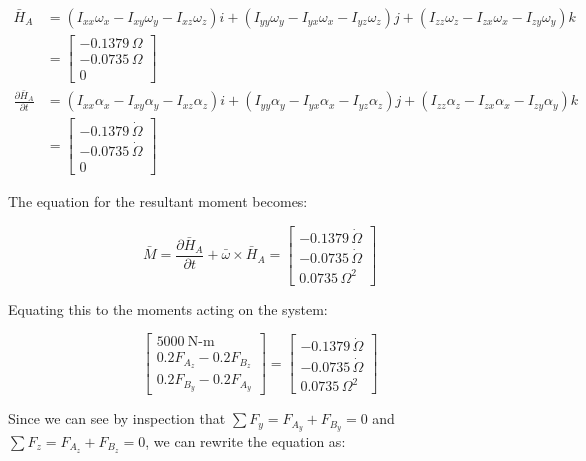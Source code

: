 \documentclass[12pt, letterpaper]{../assignment}
\begin{document}
\begin{equation*}
    \begin{aligned}
\bar{H}_A &=
\left( I_{xx}\omega_x - I_{xy}\omega_y - I_{xz}\omega_z \right) i
+\left( I_{yy}\omega_y - I_{yx}\omega_x - I_{yz}\omega_z \right) j
+\left( I_{zz}\omega_z - I_{zx}\omega_x - I_{zy}\omega_y \right) k\\
&= \left[\begin{array}{c} -0.1379\,\Omega \\ -0.0735\,\Omega \\ 0 \end{array}\right]\\
\frac{\partial \bar{H}_A}{\partial t} &=
\left( I_{xx}\alpha_x - I_{xy}\alpha_y - I_{xz}\alpha_z \right) i
+\left( I_{yy}\alpha_y - I_{yx}\alpha_x - I_{yz}\alpha_z \right) j
+\left( I_{zz}\alpha_z - I_{zx}\alpha_x - I_{zy}\alpha_y \right) k\\
&=\left[\begin{array}{c} -0.1379\,\dot{\Omega }\\ -0.0735\,\dot{\Omega }\\ 0 \end{array}\right]
\end{aligned}
\end{equation*}

The equation for the resultant moment becomes:

$$ \bar{M} = \frac{\partial \bar{H}_A}{\partial t} + \bar{\omega} \times \bar{H}_A
=\left[\begin{array}{r} -0.1379\,\dot{\Omega }\\ -0.0735\,\dot{\Omega }\\ 0.0735\,\Omega ^2 \end{array}\right]$$

Equating this to the moments acting on the system:

$$ \left[\begin{array}{r} 5000 \ \text{N-m} \\ 0.2 F_{A_z} - 0.2 F_{B_z} \\ 0.2 F_{B_y} - 0.2 F_{A_y} \end{array}\right]
=\left[\begin{array}{r} -0.1379\,\dot{\Omega }\\ -0.0735\,\dot{\Omega }\\ 0.0735\,\Omega ^2 \end{array}\right]$$

Since we can see by inspection that $\sum F_y =  F_{A_y} + F_{B_y} = 0$ and  $\sum F_z =  F_{A_z} + F_{B_z} = 0$,
we can rewrite the equation as:
\end{document}
